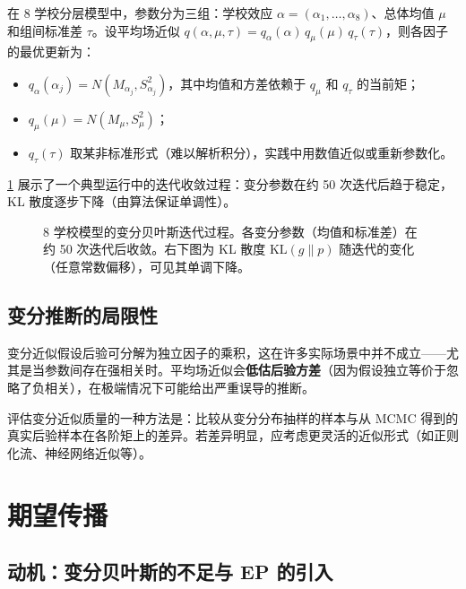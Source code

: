 \begin{Example}[8 学校模型的变分贝叶斯]\label{ex:vb-8schools}
在 8 学校分层模型中，参数分为三组：学校效应 $\alpha = (\alpha_1, \ldots, \alpha_8)$、总体均值 $\mu$ 和组间标准差 $\tau$。设平均场近似 $q(\alpha, \mu, \tau) = q_\alpha(\alpha) \, q_\mu(\mu) \, q_\tau(\tau)$，则各因子的最优更新为：

\begin{itemize}
\item $q_\alpha(\alpha_j) = N(M_{\alpha_j}, S_{\alpha_j}^2)$，其中均值和方差依赖于 $q_\mu$ 和 $q_\tau$ 的当前矩；
\item $q_\mu(\mu) = N(M_\mu, S_\mu^2)$；
\item $q_\tau(\tau)$ 取某非标准形式（难以解析积分），实践中用数值近似或重新参数化。
\end{itemize}

\cref{fig:vb-convergence} 展示了一个典型运行中的迭代收敛过程：变分参数在约 50 次迭代后趋于稳定，KL 散度逐步下降（由算法保证单调性）。
\end{Example}

\begin{figure}[htbp]
\centering
\caption{8 学校模型的变分贝叶斯迭代过程。各变分参数（均值和标准差）在约 50 次迭代后收敛。右下图为 KL 散度 $\text{KL}(g\|p)$ 随迭代的变化（任意常数偏移），可见其单调下降。}\label{fig:vb-convergence}
\end{figure}

\subsection{变分推断的局限性}\label{sec:variational-limitations}

变分近似假设后验可分解为独立因子的乘积，这在许多实际场景中并不成立——尤其是当参数间存在强相关时。平均场近似会\textbf{低估后验方差}（因为假设独立等价于忽略了负相关），在极端情况下可能给出严重误导的推断。

评估变分近似质量的一种方法是：比较从变分分布抽样的样本与从 MCMC 得到的真实后验样本在各阶矩上的差异。若差异明显，应考虑更灵活的近似形式（如正则化流、神经网络近似等）。

\section{期望传播}\label{sec:expectation-propagation}

\subsection{动机：变分贝叶斯的不足与 EP 的引入}\label{sec:ep-motivation}

